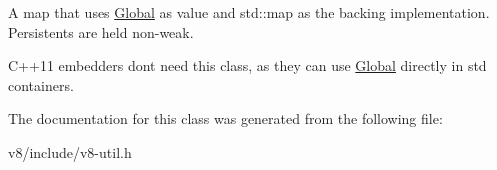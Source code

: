 A map that uses \hyperlink{classv8_1_1Global}{Global} as value and std\+::map as the backing implementation. Persistents are held non-\/weak.

C++11 embedders don\textquotesingle{}t need this class, as they can use \hyperlink{classv8_1_1Global}{Global} directly in std containers. 

The documentation for this class was generated from the following file\+:\begin{DoxyCompactItemize}
\item 
v8/include/v8-\/util.\+h\end{DoxyCompactItemize}

